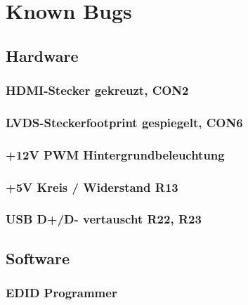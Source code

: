 \section{Known Bugs}
\subsection{Hardware}
\subsubsection{HDMI-Stecker gekreuzt, CON2}
\subsubsection{LVDS-Steckerfootprint gespiegelt, CON6}
\subsubsection{+12V PWM Hintergrundbeleuchtung}
\subsubsection{+5V Kreis / Widerstand R13}
\subsubsection{USB D+/D- vertauscht R22, R23}
\subsection{Software}
\subsubsection{EDID Programmer}
